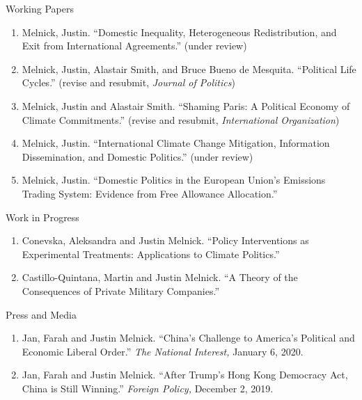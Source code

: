 \documentclass{resume} %
\begin{document}
\begin{rSection}{Working Papers}

\begin{enumerate}
    \item Melnick, Justin. ``Domestic Inequality, Heterogeneous Redistribution, and Exit from International Agreements.'' (under review)
    \item Melnick, Justin, Alastair Smith, and Bruce Bueno de Mesquita. ``Political Life Cycles.'' (revise and resubmit, \textit{Journal of Politics})
        \item Melnick, Justin and Alastair Smith. ``Shaming Paris: A Political Economy of Climate Commitments.'' (revise and resubmit, \textit{International Organization})
    \item Melnick, Justin. ``International Climate Change Mitigation, Information Dissemination, and Domestic Politics.'' (under review)
        \item Melnick, Justin. ``Domestic Politics in the European Union’s Emissions Trading System: Evidence from Free Allowance Allocation.''
\end{enumerate}

\end{rSection}

\begin{rSection}{Work in Progress}

\begin{enumerate}

    \item Conevska, Aleksandra and Justin Melnick. ``Policy Interventions as Experimental Treatments: Applications to Climate Politics.''
    \item Castillo-Quintana, Martin and Justin Melnick. ``A Theory of the Consequences of Private Military Companies.''
\end{enumerate}

\end{rSection}

\begin{rSection}{Press and Media}
    \begin{enumerate}
    \item   Jan, Farah and Justin Melnick. ``China's Challenge to America's Political and Economic Liberal Order.'' \textit{The National Interest,} January 6, 2020.
    \item    Jan, Farah and Justin Melnick. ``After Trump's Hong Kong Democracy Act, China is Still Winning.'' \textit{Foreign Policy,} December 2, 2019.
\end{enumerate}
\end{rSection}
\end{document}
